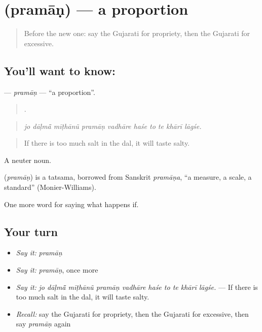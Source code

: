 \section[\texorpdfstring{\gu{પ્રમાણ} (pramāṇ)}{પ્રમાણ (pramāṇ)}]{ (pramāṇ) — a proportion}

\label{lesson:GU-C378-praman}



\begin{quote}
Before the new one: say the Gujarati for propriety, then the Gujarati for excessive.
\end{quote}

\subsection*{You'll want to know: }
\textbf{} — \emph{pramāṇ} — \textquotedblleft{}a proportion\textquotedblright{}.

\begin{quote}
         .
\end{quote}

\begin{quote}
\emph{jo dāḷmā̃ mīṭhānũ pramāṇ vadhāre haśe to te khārī lāgśe.}
\end{quote}

\begin{quote}
If there is too much salt in the dal, it will taste salty.
\end{quote}

A neuter noun.

\begin{cousinweb}
\textbf{} (\emph{pramāṇ}) is a tatsama, borrowed from Sanskrit \emph{pramāṇa}, \textquotedblleft{}a measure, a scale, a standard\textquotedblright{} (Monier-Williams).
\end{cousinweb}

\begin{grammarlens}[title={What you've built}]
One more word for saying what happens if.
\end{grammarlens}

\subsection*{Your turn}
\begin{itemize}
\raggedright
  \item \emph{Say it:} \emph{pramāṇ}
  \item \emph{Say it:} \emph{pramāṇ}, once more
  \item \emph{Say it:} \emph{jo dāḷmā̃ mīṭhānũ pramāṇ vadhāre haśe to te khārī lāgśe.} — If there is too much salt in the dal, it will taste salty.
  \item \emph{Recall:} say the Gujarati for propriety, then the Gujarati for excessive, then say \emph{pramāṇ} again
\end{itemize}

